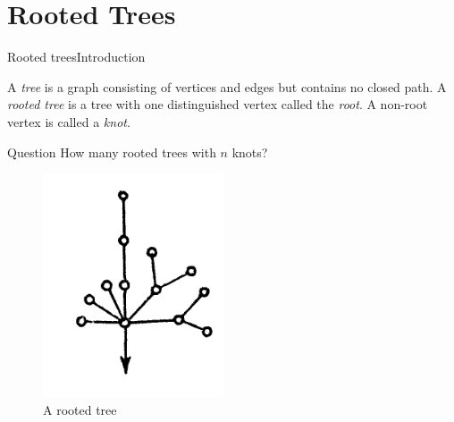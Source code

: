 \documentclass{beamer}
\begin{document}
    \section{Rooted Trees}
    \begin{frame}{Rooted trees}{Introduction}
        \begin{definition}
            A \emph{tree} is a graph consisting of vertices and edges 
            but contains no closed path. A \emph{rooted tree} is a tree with one distinguished vertex called the \emph{root}. A non-root vertex is called a \emph{knot}.
        \end{definition}
        \begin{block}{Question}
            How many rooted trees with $n$ knots?
        \end{block}
        \begin{figure}
            \centering
            \includegraphics[scale=0.5]{images/rooted-tree.png}
            \caption{A rooted tree}
            \label{fig:enter-label}
        \end{figure}
    \end{frame}
\end{document}
